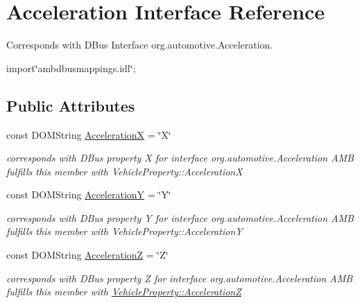 \hypertarget{interfaceAcceleration}{\section{Acceleration Interface Reference}
\label{interfaceAcceleration}
}


Corresponds with D\+Bus Interface org.\+automotive.\+Acceleration.  




{\ttfamily import\char`\"{}ambdbusmappings.\+idl\char`\"{};}

\subsection*{Public Attributes}
\begin{DoxyCompactItemize}
\item 
\hypertarget{interfaceAcceleration_afd949d9a607325dd663e5a96d9414341}{const D\+O\+M\+String \hyperlink{interfaceAcceleration_afd949d9a607325dd663e5a96d9414341}{Acceleration\+X} = \char`\"{}X\char`\"{}}\label{interfaceAcceleration_afd949d9a607325dd663e5a96d9414341}

\begin{DoxyCompactList}\small\item\em corresponds with D\+Bus property X for interface org.\+automotive.\+Acceleration A\+M\+B fulfills this member with Vehicle\+Property\+::\+Acceleration\+X \end{DoxyCompactList}\item 
\hypertarget{interfaceAcceleration_a92b772ac8f46b38f759f0657337371f1}{const D\+O\+M\+String \hyperlink{interfaceAcceleration_a92b772ac8f46b38f759f0657337371f1}{Acceleration\+Y} = \char`\"{}Y\char`\"{}}\label{interfaceAcceleration_a92b772ac8f46b38f759f0657337371f1}

\begin{DoxyCompactList}\small\item\em corresponds with D\+Bus property Y for interface org.\+automotive.\+Acceleration A\+M\+B fulfills this member with Vehicle\+Property\+::\+Acceleration\+Y \end{DoxyCompactList}\item 
\hypertarget{interfaceAcceleration_acf61a6e0209c256b838ce995554be1b9}{const D\+O\+M\+String \hyperlink{interfaceAcceleration_acf61a6e0209c256b838ce995554be1b9}{Acceleration\+Z} = \char`\"{}Z\char`\"{}}\label{interfaceAcceleration_acf61a6e0209c256b838ce995554be1b9}

\begin{DoxyCompactList}\small\item\em corresponds with D\+Bus property Z for interface org.\+automotive.\+Acceleration A\+M\+B fulfills this member with \hyperlink{classVehicleProperty_a1ce0b3be3a09d5a96741890d0d67496f}{Vehicle\+Property\+::\+Acceleration\+Z} \end{DoxyCompactList}\end{DoxyCompactItemize}


